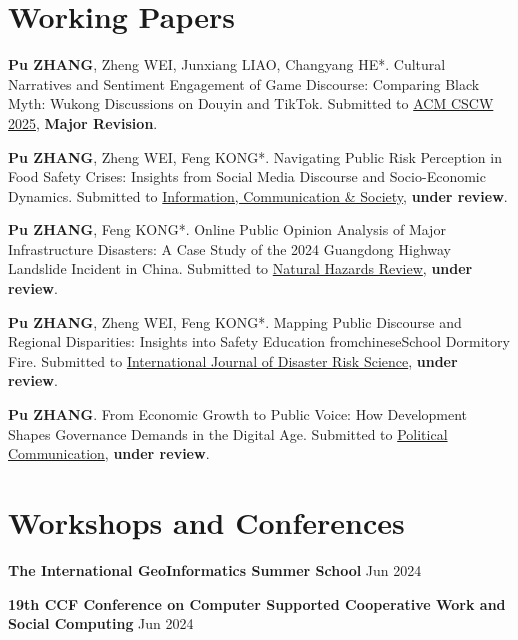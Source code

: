\documentclass[letterpaper, 11pt]{article}
\newcommand{\sepspace}{\vspace{0.5em}}
\begin{document}
\begingroup
\setlength{\parskip}{0pt}
\nocite{*}
\printbibliography[heading=none]
\endgroup

\section{Working Papers}

\textbf{Pu ZHANG}, Zheng WEI, Junxiang LIAO, Changyang HE*. Cultural Narratives and Sentiment Engagement of Game Discourse: Comparing Black Myth: Wukong Discussions on Douyin and TikTok. Submitted to \href{https://cscw.acm.org/2025/}{ACM CSCW 2025}, \textbf{Major Revision}.
\sepspace

\textbf{Pu ZHANG}, Zheng WEI, Feng KONG*. Navigating Public Risk Perception in Food Safety Crises: Insights from Social Media Discourse and Socio-Economic Dynamics. Submitted to \href{https://www.tandfonline.com/journals/rics20}{Information, Communication \& Society}, \textbf{under review}.
\sepspace

\textbf{Pu ZHANG}, Feng KONG*. Online Public Opinion Analysis of Major Infrastructure Disasters: A Case Study of the 2024 Guangdong Highway Landslide Incident in China. Submitted to \href{https://ascelibrary.org/journal/nhrefo}{Natural Hazards Review}, \textbf{under review}.
\sepspace

\textbf{Pu ZHANG}, Zheng WEI, Feng KONG*. Mapping Public Discourse and Regional Disparities: Insights into Safety Education fromchineseSchool Dormitory Fire. Submitted to \href{https://link.springer.com/journal/13753}{International Journal of Disaster Risk Science}, \textbf{under review}.
\sepspace

\textbf{Pu ZHANG}. From Economic Growth to Public Voice: How Development Shapes Governance Demands in the Digital Age. Submitted to \href{https://www.tandfonline.com/journals/upcp20}{Political Communication}, \textbf{under review}.
\sepspace

\section{Workshops and Conferences}

\sepspace
\textbf{The International GeoInformatics Summer School} \hfill Jun 2024

\sepspace
\textbf{19th CCF Conference on Computer Supported Cooperative Work and Social Computing} \hfill Jun 2024
\end{document}
